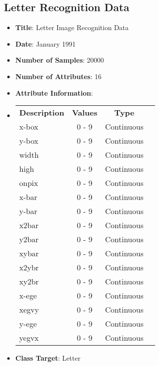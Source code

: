 \documentclass[11pt]{article}
\newcommand{\bb}{\textbf}
\begin{document}
\subsection{Letter Recognition Data}
\begin{itemize}[leftmargin=*]
  \item[] \bb{Title}: Letter Image Recognition Data
  \item[] \bb{Date}: January 1991
  \item[] \bb{Number of Samples}: 20000
  \item[] \bb{Number of Attributes}: 16
  \item[] \bb{Attribute Information}:
  \item[]
  \begin{tabular}{l c c c }
    \bb{Description} & \bb{Values}            & \bb{Type}  \\
    x-box	           & 0 - 9                  & Continuous \\
    y-box	           & 0 - 9                  & Continuous \\
    width	           & 0 - 9                  & Continuous \\
    high 	           & 0 - 9                  & Continuous \\
    onpix	           & 0 - 9                  & Continuous \\
    x-bar	           & 0 - 9                  & Continuous \\
    y-bar	           & 0 - 9                  & Continuous \\
    x2bar	           & 0 - 9                  & Continuous \\
    y2bar	           & 0 - 9                  & Continuous \\
    xybar	           & 0 - 9                  & Continuous \\
    x2ybr	           & 0 - 9                  & Continuous \\
    xy2br	           & 0 - 9                  & Continuous \\
    x-ege	           & 0 - 9                  & Continuous \\
    xegvy	           & 0 - 9                  & Continuous \\
    y-ege	           & 0 - 9                  & Continuous \\
    yegvx	           & 0 - 9                  & Continuous
  \end{tabular}
  \item[] \bb{Class Target}: Letter

\end{itemize}
\end{document}
